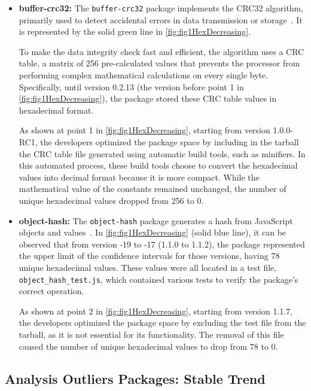 \begin{itemize}
     \item \textbf{buffer-crc32:} The \texttt{buffer-crc32} package implements the \ac{CRC32} algorithm, 
    primarily used to detect accidental errors in data transmission or storage~\cite{buffer-crc32}.
    It is represented by the solid green line in \cref{fig:fig1HexDecreasing}.

    To make the data integrity check fast and efficient, the algorithm uses a CRC table, 
    a matrix of 256 pre-calculated values that prevents the processor from performing complex mathematical calculations 
    on every single byte.
    Specifically, until version 0.2.13 (the version before point 1 in \cref{fig:fig1HexDecreasing}), 
    the package stored these CRC table values in hexadecimal format.

    As shown at point 1 in \cref{fig:fig1HexDecreasing}, starting from version 1.0.0-RC1, 
    the developers optimized the package space by including in the tarball 
    the CRC table file generated using automatic build tools, such as minifiers.
    In this automated process, these build tools choose to convert the hexadecimal values into decimal format because it is more compact.
    While the mathematical value of the constants remained unchanged, 
    the number of unique hexadecimal values dropped from 256 to 0.


    \item \textbf{object-hash:} The \texttt{object-hash} package generates a hash from JavaScript objects and values~\cite{object-hash}.
    In \cref{fig:fig1HexDecreasing} (solid blue line), it can be observed that from version -19 to -17 (1.1.0 to 1.1.2),
    the package represented the upper limit of the confidence intervals for those versions, having 78 unique hexadecimal values.
    These values were all located in a test file, \texttt{object\_hash\_test.js}, which contained various tests to verify the package's correct operation.

    As shown at point 2 in \cref{fig:fig1HexDecreasing}, starting from version 1.1.7,
    the developers optimized the package space by excluding the test file from the tarball,
    as it is not essential for its functionality.
    The removal of this file caused the number of unique hexadecimal values to drop from 78 to 0.

\end{itemize}


\subsection*{Analysis Outliers Packages: Stable Trend}
\label{sec:analysisHexStable}

